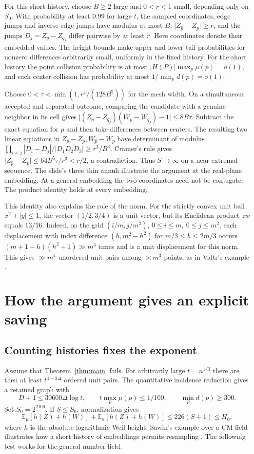 \documentclass[11pt,letterpaper,oneside,reqno]{amsart}
\theoremstyle{definition}
\begin{document}
For this short history, choose \(B\ge2\) large and \(0<r<1\) small,
depending only on \(S_0\). With probability at least \(0.99\) for large \(t\),
the sampled coordinates, edge jumps and inverse edge jumps have modulus
at most \(B\),
\(\lvert Z_{\widehat p}-Z_p\rvert\ge r\), and the jumps
\(D_j=Z_p-Z_{q_j}\) differ pairwise by at least \(r\).
Here coordinates denote their embedded values. The height bounds make
upper and lower tail probabilities for nonzero differences arbitrarily
small, uniformly in the fixed history. For the short history the point collision
probability is at most \(|H(P)|\max_p\mu(p)=o(1)\), and each center
collision has probability at most \(1/\min_p d(p)=o(1)\).

Choose \(0<\tau<\min(1,r^4/(128B^5))\) for the mesh width. On a
simultaneous accepted and separated outcome, comparing the candidate
with a genuine neighbor in its cell gives
\(\lvert(Z_{\widehat p}-Z_{q_j})(W_{\widehat p}-W_{q_j})-1\rvert
\le 8B\tau\).
Subtract the exact equation for \(p\) and then take differences between
centers. The resulting two linear equations in
\(Z_{\widehat p}-Z_p,W_{\widehat p}-W_p\) have determinant of modulus
\(\prod_{i<j}|D_i-D_j|/|D_1D_2D_3|\ge r^3/B^3\).
Cramer's rule gives
\(\lvert Z_{\widehat p}-Z_p\rvert\le64B^5\tau/r^3<r/2\), a contradiction.
Thus \(S\to\infty\) on a near-extremal sequence. The slide's three thin
annuli illustrate the argument at the real-plane embedding. At a general
embedding the two coordinates need not be conjugate. The product identity holds
at every embedding.

This identity also explains the role of the norm. For the strictly convex
unit ball \(x^2+|y|\le1\), the vector \((1/2,3/4)\) is a unit vector,
but its Euclidean product \(zw\) equals \(13/16\). Indeed, on the grid
\((i/m,j/m^2)\), \(0\le i\le m,\ 0\le j\le m^2\), each displacement
with index difference \((h,m^2-h^2)\) for \(m/3\le h\le2m/3\) occurs
\((m+1-h)(h^2+1)\gg m^3\) times and is a unit displacement for this
norm. This gives \(\gg m^4\) unordered unit pairs among \(\asymp m^3\)
points, as in Valtr's example \cite{valtr}.

\section{How the argument gives an explicit saving}
\subsection{Counting histories fixes the exponent}
Assume that Theorem~\ref{thm:main} fails. For arbitrarily large
\(t=n^{1/3}\) there are then at least \(t^{4-3\Delta}\) ordered unit
pairs. The quantitative incidence reduction gives a retained graph with
\[
 D+1\le30600\Delta\log t,\qquad
 t\max_p\mu(p)\le 1/100,\qquad \min_p d(p)\ge300 .
\]
Set \(S_0=2^{2100}\). If \(S\le S_0\), normalization gives
\[
 \mathbb E_\mu[h(Z)+h(W)]+\mathbb E_\kappa[h(Z)+h(W)]
 \le226(S+1)\le H_0 ,
\]
where \(h\) is the absolute logarithmic Weil height. Sawin's example
over a CM field illustrates how a short history of embeddings permits
resampling \cite[post 9400]{sawin}. The following test works for the
general number field.
\end{document}
